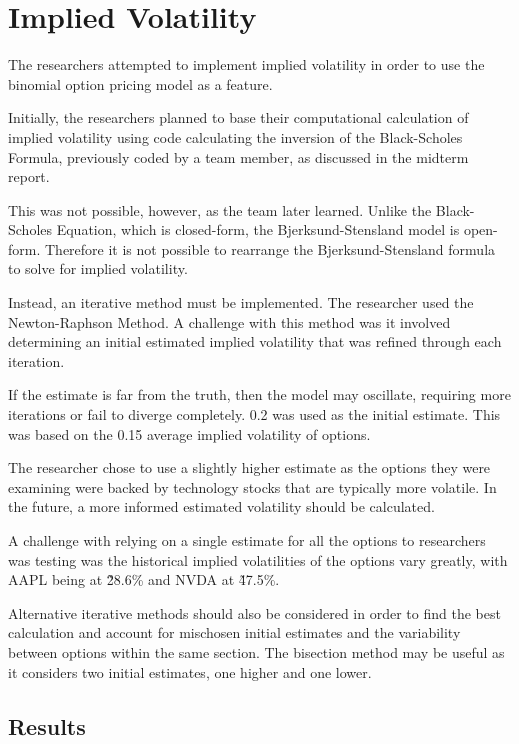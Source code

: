 \documentclass[11pt]{article}
\begin{document}
\section{Implied Volatility}
The  researchers attempted to implement implied volatility in order to use the binomial option pricing model as a feature. 

Initially, the researchers planned to base their computational calculation of implied volatility using code calculating the inversion of the Black-Scholes Formula, previously coded by a team member, as discussed in the midterm report. 

This was not possible, however, as the team later learned. Unlike the Black-Scholes Equation, which is closed-form, the Bjerksund-Stensland model is open-form. Therefore it is not possible to rearrange the Bjerksund-Stensland formula to solve for implied volatility. 

Instead, an iterative method must be implemented. The researcher used the Newton-Raphson Method. A challenge with this method was it involved determining an initial estimated implied volatility that was refined through each iteration. 

If the estimate is far from the truth, then the model may oscillate, requiring more iterations or fail to diverge completely. 0.2 was used as the initial estimate. This was based on the 0.15 average implied volatility of options. 

The researcher chose to use a slightly higher estimate as the options they were examining were backed by technology stocks that are typically more volatile. In the future, a more informed estimated volatility should be calculated. 

A challenge with relying on a single estimate for all the options to researchers was testing was the historical implied volatilities of the options vary greatly, with AAPL being at \~28.6\% and NVDA at \~47.5\%. 

Alternative iterative methods should also be considered in order to find the best calculation and account for mischosen initial estimates and the variability between options within the same section. The bisection method may be useful as it considers two initial estimates, one higher and one lower.


\subsection{Results}
\end{document}
